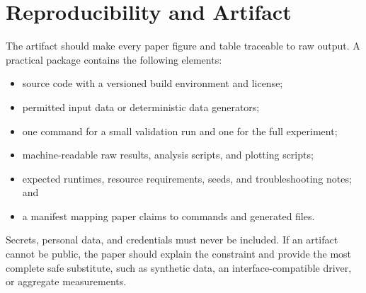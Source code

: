 \section{Reproducibility and Artifact}

The artifact should make every paper figure and table traceable to raw output.
A practical package contains the following elements:

\begin{itemize}
  \item source code with a versioned build environment and license;
  \item permitted input data or deterministic data generators;
  \item one command for a small validation run and one for the full experiment;
  \item machine-readable raw results, analysis scripts, and plotting scripts;
  \item expected runtimes, resource requirements, seeds, and troubleshooting
        notes; and
  \item a manifest mapping paper claims to commands and generated files.
\end{itemize}

Secrets, personal data, and credentials must never be included.  If an artifact
cannot be public, the paper should explain the constraint and provide the most
complete safe substitute, such as synthetic data, an interface-compatible
driver, or aggregate measurements.
